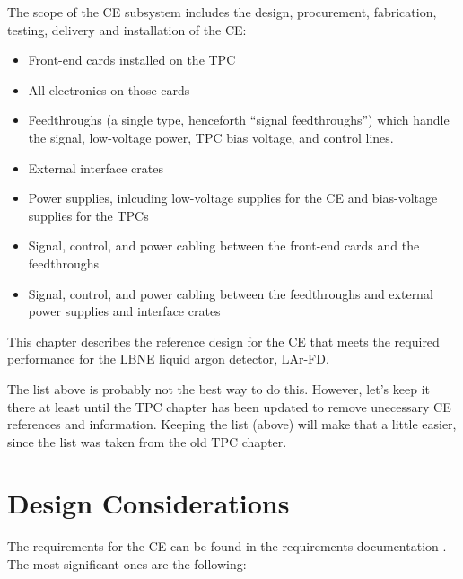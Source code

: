 The scope of the CE subsystem includes the design, procurement, fabrication, testing,
delivery and installation of the CE:
\begin{itemize}
\item Front-end cards installed on the TPC
\item All electronics on those cards
\item Feedthroughs (a single type, henceforth ``signal feedthroughs'') which handle the signal,
low-voltage power, TPC bias voltage, and control lines.
\item External interface crates
\item Power supplies, inlcuding low-voltage supplies for the CE and bias-voltage supplies for the TPCs
\item Signal, control, and power cabling between the front-end cards and the feedthroughs
\item Signal, control, and power cabling between the feedthroughs and external power supplies and interface crates
\end{itemize}
This chapter describes the reference design for the CE that meets the required performance for the LBNE liquid argon detector,
LAr-FD.
\begin{editornote}
  The list above is probably not the best way to do this.  However, let's keep it there at least until the TPC chapter has been
  updated to remove unecessary CE references and information.  Keeping the list (above) will make that a little easier, since the
  list was taken from the old TPC chapter.
\end{editornote}

%
\section{Design Considerations} 
\label{sec:ce-reqs-n-specs}

The requirements for the CE can be found in the requirements documentation \cite{lar-fd-req}.
The most significant ones are the following:


